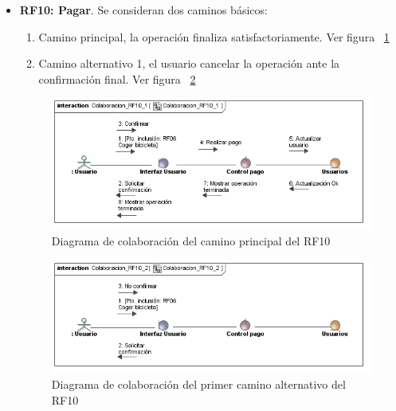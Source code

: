\begin{itemize}
	\FloatBarrier
	\item \textbf{RF10: Pagar}. Se consideran dos caminos básicos: 
	\begin{enumerate}
		\item Camino principal, la operación finaliza satisfactoriamente. Ver figura ~\ref{fig:diagramaColaboracion_RF10_1}
		\item Camino alternativo 1, el usuario cancelar la operación ante la confirmación final. Ver figura ~\ref{fig:diagramaColaboracion_RF10_2}
	\end{enumerate}
	\begin{figure} [!htb]
		\centering
		\includegraphics[width=\linewidth,height=\textheight,keepaspectratio]{Images/Diagramas/04_Colaboracion_RF10_1}
		\caption{Diagrama de colaboración del camino principal del RF10}
		\label{fig:diagramaColaboracion_RF10_1}
	\end{figure}
	\begin{figure} [!htb]
		\centering
		\includegraphics[width=\linewidth,height=\textheight,keepaspectratio]{Images/Diagramas/04_Colaboracion_RF10_2}
		\caption{Diagrama de colaboración del primer camino alternativo del RF10}
		\label{fig:diagramaColaboracion_RF10_2}
	\end{figure}
	

\end{itemize}
